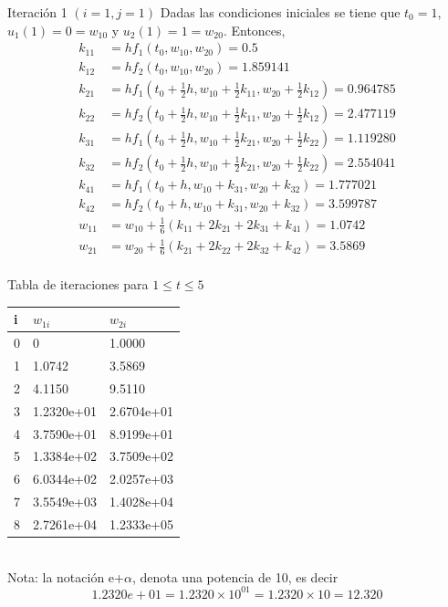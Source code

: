 \begin{frame}{Iteración 1 $(i=1, j=1)$}
Dadas las condiciones iniciales se tiene que $t_0=1$, $u_1(1)=0=w_{10}$ y $u_2(1)=1=w_{20}$. Entonces, 
\begin{align*}
k_{11} &= hf_1(t_0, w_{10}, w_{20})=0.5\\
k_{12} &= hf_2(t_0, w_{10}, w_{20})=1.859141\\
k_{21} &= hf_1(t_0+\frac{1}{2}h, w_{10}+\frac{1}{2}k_{11}, w_{20}+\frac{1}{2}k_{12})=0.964785\\
k_{22} &= hf_2(t_0+\frac{1}{2}h, w_{10}+\frac{1}{2}k_{11}, w_{20}+\frac{1}{2}k_{12})=2.477119\\
k_{31} &= hf_1(t_0+\frac{1}{2}h, w_{10}+\frac{1}{2}k_{21}, w_{20}+\frac{1}{2}k_{22})=1.119280\\
k_{32} &= hf_2(t_0+\frac{1}{2}h, w_{10}+\frac{1}{2}k_{21}, w_{20}+\frac{1}{2}k_{22})=2.554041\\
k_{41} &= hf_1(t_0+h, w_{10} + k_{31}, w_{20}+k_{32})=1.777021\\
k_{42} &= hf_2(t_0+h, w_{10} + k_{31}, w_{20}+k_{32})=3.599787\\
w_{11}&=w_{10}+\frac{1}{6}(k_{11}+2k_{21}+2k_{31}+k_{41})=1.0742\\
w_{21}&=w_{20}+\frac{1}{6}(k_{21}+2k_{22}+2k_{32}+k_{42})=3.5869\\
\end{align*}
\end{frame}

\begin{frame}{Tabla de iteraciones para $1\leq t \leq 5$}
\begin{table}[]
\renewcommand{\arraystretch}{1.5}
\begin{tabular}{|l|l|l|}
\hline
\textbf{i} & \textbf{$w_{1i}$} & \textbf{$w_{2i}$} \\ \hline
0 & 0 & 1.0000 \\ \hline
1 & 1.0742 & 3.5869 \\ \hline
2 & 4.1150 & 9.5110 \\ \hline
3 & 1.2320e+01 & 2.6704e+01 \\ \hline
4 & 3.7590e+01 & 8.9199e+01 \\ \hline
5 & 1.3384e+02 & 3.7509e+02 \\ \hline
6 & 6.0344e+02 & 2.0257e+03 \\ \hline
7 & 3.5549e+03 & 1.4028e+04 \\ \hline
8 & 2.7261e+04 & 1.2333e+05 \\ \hline
\end{tabular}\\
\vspace{1cm}
Nota: la notación e+$\alpha$, denota una potencia de 10, es decir
$$1.2320e+01=1.2320\times 10^{01}=1.2320\times 10=12.320$$
\end{table}
\end{frame}

